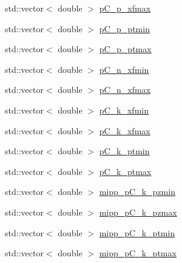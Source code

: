 \begin{DoxyCompactItemize}
\item 
std\-::vector$<$ double $>$ \hyperlink{class_neutrino_flux_reweight_1_1_thin_target_bins_aa3fb21c1755a0a90c287f02b53d46d8d}{p\-C\-\_\-p\-\_\-xfmax}
\item 
std\-::vector$<$ double $>$ \hyperlink{class_neutrino_flux_reweight_1_1_thin_target_bins_ad17062da0ad8790552e66617d0fc0067}{p\-C\-\_\-p\-\_\-ptmin}
\item 
std\-::vector$<$ double $>$ \hyperlink{class_neutrino_flux_reweight_1_1_thin_target_bins_a5b942ecd3723fb8ec06420082b9861af}{p\-C\-\_\-p\-\_\-ptmax}
\item 
std\-::vector$<$ double $>$ \hyperlink{class_neutrino_flux_reweight_1_1_thin_target_bins_adf9a4dab8c39079f18ecdb6670bf9328}{p\-C\-\_\-n\-\_\-xfmin}
\item 
std\-::vector$<$ double $>$ \hyperlink{class_neutrino_flux_reweight_1_1_thin_target_bins_ad610d70e8ad55e62356d7bdcd06c53ab}{p\-C\-\_\-n\-\_\-xfmax}
\item 
std\-::vector$<$ double $>$ \hyperlink{class_neutrino_flux_reweight_1_1_thin_target_bins_a6ea704e14228a94c3224989545b68e43}{p\-C\-\_\-k\-\_\-xfmin}
\item 
std\-::vector$<$ double $>$ \hyperlink{class_neutrino_flux_reweight_1_1_thin_target_bins_a180c280fc86b8b00711dfe8285265442}{p\-C\-\_\-k\-\_\-xfmax}
\item 
std\-::vector$<$ double $>$ \hyperlink{class_neutrino_flux_reweight_1_1_thin_target_bins_a33433920d029d7f1fd1de56f4b0e672e}{p\-C\-\_\-k\-\_\-ptmin}
\item 
std\-::vector$<$ double $>$ \hyperlink{class_neutrino_flux_reweight_1_1_thin_target_bins_ade2dd6b6ee73ad9b8437e539164f84f4}{p\-C\-\_\-k\-\_\-ptmax}
\item 
std\-::vector$<$ double $>$ \hyperlink{class_neutrino_flux_reweight_1_1_thin_target_bins_a4b235f101eb246b1c539fe8d7f14a7bb}{mipp\-\_\-p\-C\-\_\-k\-\_\-pzmin}
\item 
std\-::vector$<$ double $>$ \hyperlink{class_neutrino_flux_reweight_1_1_thin_target_bins_a6dea19227aba5888568c06753580cc71}{mipp\-\_\-p\-C\-\_\-k\-\_\-pzmax}
\item 
std\-::vector$<$ double $>$ \hyperlink{class_neutrino_flux_reweight_1_1_thin_target_bins_a46cab0c42e0918a6bac1f71710e0f886}{mipp\-\_\-p\-C\-\_\-k\-\_\-ptmin}
\item 
std\-::vector$<$ double $>$ \hyperlink{class_neutrino_flux_reweight_1_1_thin_target_bins_adda5c5dfe7c1edd42d1b95cc9ea2d356}{mipp\-\_\-p\-C\-\_\-k\-\_\-ptmax}
\item 

\end{DoxyCompactItemize}
